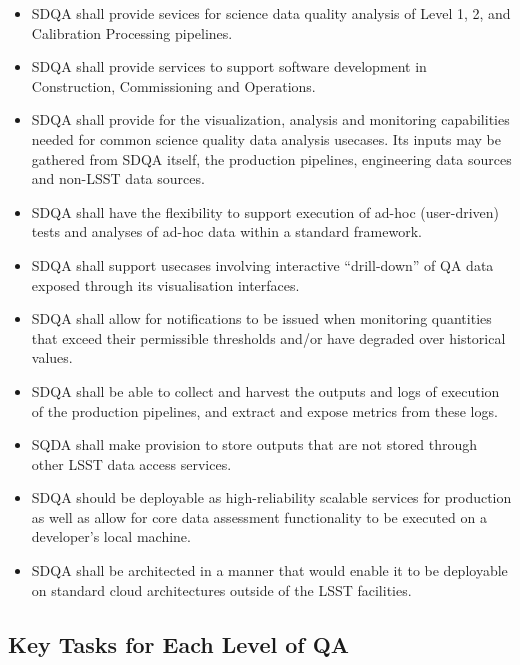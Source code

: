 \begin{itemize}
\item SDQA shall provide sevices for science data quality analysis of Level 1, 2, and Calibration Processing pipelines.

\item SDQA shall provide services to support software development in Construction, Commissioning and Operations.

\item SDQA shall provide for the visualization, analysis and monitoring capabilities needed for common science quality data analysis usecases. Its inputs may be gathered from SDQA itself, the production pipelines, engineering data sources and non-LSST data sources.

\item SDQA shall have the flexibility to support execution of ad-hoc (user-driven) tests and analyses of ad-hoc data within a standard framework.

\item SDQA shall support usecases involving interactive ``drill-down'' of QA data exposed through its visualisation interfaces.

\item SDQA shall allow for notifications to be issued when monitoring quantities that exceed their permissible thresholds and/or have degraded over historical values.

\item SDQA shall be able to collect and harvest the outputs and logs of execution of the production pipelines, and extract and expose metrics from these logs.

\item SQDA shall make provision to store outputs that are not stored through other LSST data access services.

\item SDQA should be deployable as high-reliability scalable services for production as well as allow for core data assessment functionality to be executed on a developer's local machine.

\item SDQA shall be architected in a manner that would enable it to be deployable on standard cloud architectures outside of the LSST facilities.


\end{itemize}


\subsection{Key Tasks for Each Level of QA}

